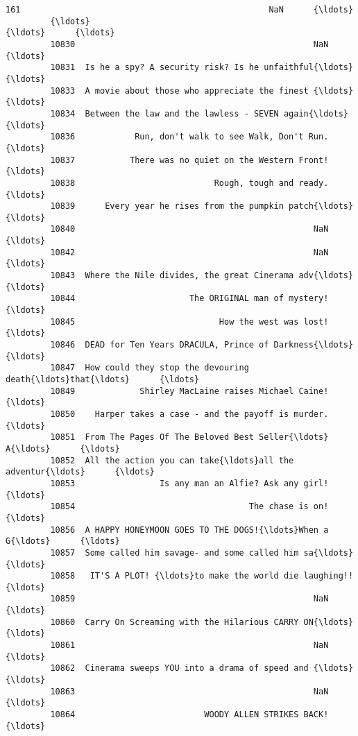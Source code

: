 \documentclass[11pt]{article}
\begin{document}
\begin{Verbatim}[commandchars=\\\{\}]
         161                                                  NaN      {\ldots}        
         {\ldots}                                                  {\ldots}      {\ldots}        
         10830                                                NaN      {\ldots}        
         10831  Is he a spy? A security risk? Is he unfaithful{\ldots}      {\ldots}        
         10833  A movie about those who appreciate the finest {\ldots}      {\ldots}        
         10834  Between the law and the lawless - SEVEN again{\ldots}      {\ldots}        
         10836            Run, don't walk to see Walk, Don't Run.      {\ldots}        
         10837           There was no quiet on the Western Front!      {\ldots}        
         10838                            Rough, tough and ready.      {\ldots}        
         10839      Every year he rises from the pumpkin patch{\ldots}      {\ldots}        
         10840                                                NaN      {\ldots}        
         10842                                                NaN      {\ldots}        
         10843  Where the Nile divides, the great Cinerama adv{\ldots}      {\ldots}        
         10844                       The ORIGINAL man of mystery!      {\ldots}        
         10845                             How the west was lost!      {\ldots}        
         10846  DEAD for Ten Years DRACULA, Prince of Darkness{\ldots}      {\ldots}        
         10847  How could they stop the devouring death{\ldots}that{\ldots}      {\ldots}        
         10849             Shirley MacLaine raises Michael Caine!      {\ldots}        
         10850    Harper takes a case - and the payoff is murder.      {\ldots}        
         10851  From The Pages Of The Beloved Best Seller{\ldots} A{\ldots}      {\ldots}        
         10852  All the action you can take{\ldots}all the adventur{\ldots}      {\ldots}        
         10853                 Is any man an Alfie? Ask any girl!      {\ldots}        
         10854                                   The chase is on!      {\ldots}        
         10856  A HAPPY HONEYMOON GOES TO THE DOGS!{\ldots}When a G{\ldots}      {\ldots}        
         10857  Some called him savage- and some called him sa{\ldots}      {\ldots}        
         10858   IT'S A PLOT! {\ldots}to make the world die laughing!!      {\ldots}        
         10859                                                NaN      {\ldots}        
         10860  Carry On Screaming with the Hilarious CARRY ON{\ldots}      {\ldots}        
         10861                                                NaN      {\ldots}        
         10862  Cinerama sweeps YOU into a drama of speed and {\ldots}      {\ldots}        
         10863                                                NaN      {\ldots}        
         10864                          WOODY ALLEN STRIKES BACK!      {\ldots}        
         

\end{Verbatim}
\end{document}
